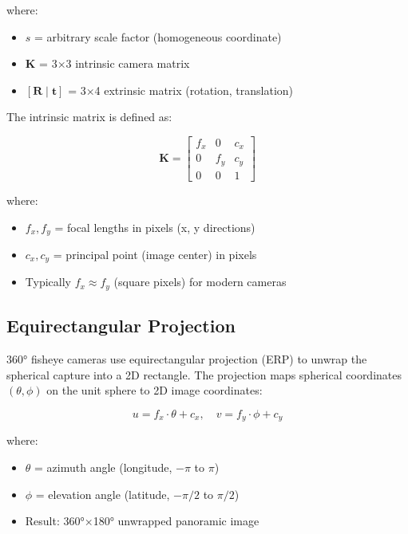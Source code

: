 \documentclass[11pt,a4paper,oneside]{article}
\begin{document}
where:
\begin{itemize}
    \item $s$ = arbitrary scale factor (homogeneous coordinate)
    \item $\mathbf{K}$ = 3×3 intrinsic camera matrix
    \item $[\mathbf{R} \mid \mathbf{t}]$ = 3×4 extrinsic matrix (rotation, translation)
\end{itemize}

The intrinsic matrix is defined as:

\begin{equation}
\mathbf{K} = \begin{bmatrix}
f_x & 0 & c_x \\
0 & f_y & c_y \\
0 & 0 & 1
\end{bmatrix}
\label{eq:intrinsic}
\end{equation}

where:
\begin{itemize}
    \item $f_x, f_y$ = focal lengths in pixels (x, y directions)
    \item $c_x, c_y$ = principal point (image center) in pixels
    \item Typically $f_x \approx f_y$ (square pixels) for modern cameras
\end{itemize}

\subsection{Equirectangular Projection}

360° fisheye cameras use equirectangular projection (ERP) to unwrap the spherical capture into a 2D rectangle. The projection maps spherical coordinates $(\theta, \phi)$ on the unit sphere to 2D image coordinates:

\begin{equation}
u = f_x \cdot \theta + c_x, \quad v = f_y \cdot \phi + c_y
\label{eq:erp}
\end{equation}

where:
\begin{itemize}
    \item $\theta$ = azimuth angle (longitude, $-\pi$ to $\pi$)
    \item $\phi$ = elevation angle (latitude, $-\pi/2$ to $\pi/2$)
    \item Result: 360°×180° unwrapped panoramic image
\end{itemize}
\end{document}

